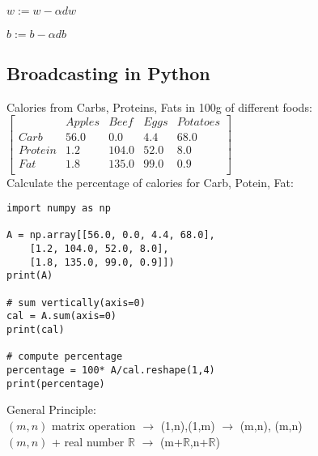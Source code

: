 \documentclass{article}
\begin{document}
$w := w-\alpha dw$\

$b := b-\alpha db$\\

\newpage
\subsection{Broadcasting in Python}

Calories from Carbs, Proteins, Fats in 100g of different foods: \\

$\begin{bmatrix}
& Apples & Beef & Eggs & Potatoes \\
Carb & 56.0 & 0.0 & 4.4 & 68.0 \\
Protein & 1.2 & 104.0 & 52.0 & 8.0 \\
Fat & 1.8 & 135.0 & 99.0 & 0.9 \\
\end{bmatrix}$\\

Calculate the percentage of calories for Carb, Potein, Fat:\\

\lstset{language=Python}
\begin{lstlisting}
import numpy as np

A = np.array[[56.0, 0.0, 4.4, 68.0],
    [1.2, 104.0, 52.0, 8.0],
    [1.8, 135.0, 99.0, 0.9]])
print(A)

# sum vertically(axis=0)
cal = A.sum(axis=0)
print(cal)

# compute percentage
percentage = 100* A/cal.reshape(1,4)
print(percentage)
\end{lstlisting}


General Principle:\\

$(m,n)$ matrix operation $\rightarrow$ (1,n),(1,m) $\rightarrow$ (m,n), (m,n)\\

$(m,n)$ + real number $\mathbb{R}$ $\rightarrow$ (m+$\mathbb{R}$,n+$\mathbb{R}$)\\


\newpage
\subsection{}
\end{document}
